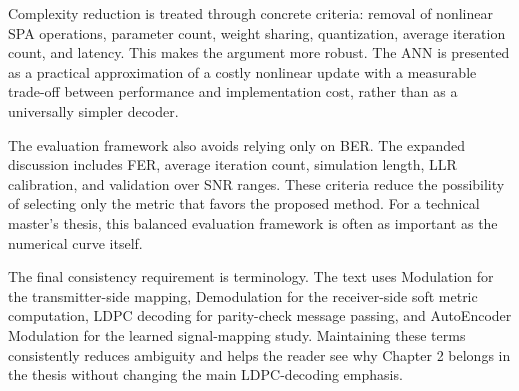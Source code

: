 Complexity reduction is treated through concrete criteria: removal of nonlinear SPA operations, parameter count, weight sharing, quantization, average iteration count, and latency. This makes the argument more robust. The ANN is presented as a practical approximation of a costly nonlinear update with a measurable trade-off between performance and implementation cost, rather than as a universally simpler decoder.

The evaluation framework also avoids relying only on BER. The expanded discussion includes FER, average iteration count, simulation length, LLR calibration, and validation over SNR ranges. These criteria reduce the possibility of selecting only the metric that favors the proposed method. For a technical master's thesis, this balanced evaluation framework is often as important as the numerical curve itself.

The final consistency requirement is terminology. The text uses Modulation for the transmitter-side mapping, Demodulation for the receiver-side soft metric computation, LDPC decoding for parity-check message passing, and AutoEncoder Modulation for the learned signal-mapping study. Maintaining these terms consistently reduces ambiguity and helps the reader see why Chapter 2 belongs in the thesis without changing the main LDPC-decoding emphasis.
